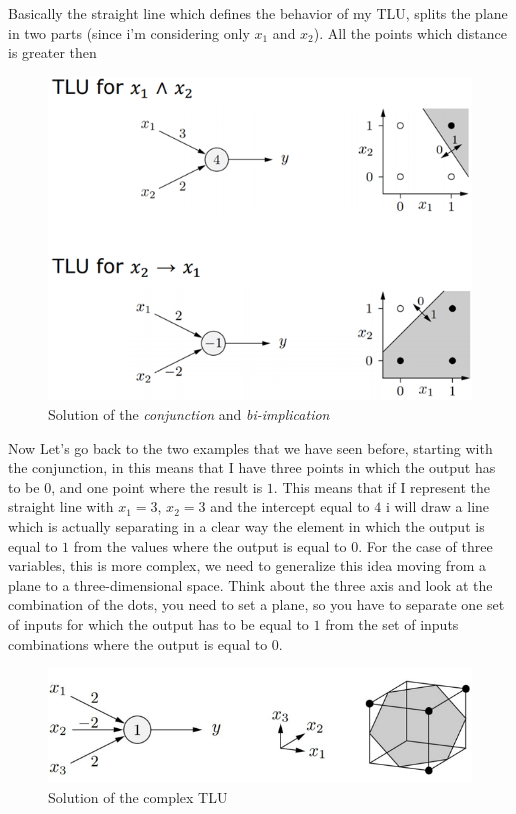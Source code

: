 \documentclass{article}
\begin{document}
Basically the straight line which defines the behavior of my TLU, splits the plane in two parts (since i'm
considering only $x_1$ and $x_2$). All the points which distance is greater then

\begin{figure}[H]
    \centering
    \includegraphics[scale=0.8]{images/tlu_examples_interp.png}
    \caption{Solution of the \textit{conjunction} and \textit{bi-implication}}
    \label{fig:example_interp}
\end{figure}

Now Let’s go back to the two examples that we have seen before,
starting with the conjunction, in this means that I have three points in which the output
has to be $0$, and one point where the result is $1$. This means that if I represent the straight
line with $x_1=3$, $x_2=3$ and the intercept equal to $4$ i will draw a line which is actually
separating in a clear way the element in which the output is equal to $1$ from the values
where the output is equal to $0$.
\newline
\newline
For the case of three variables, this is more complex, we need to generalize this idea moving from
a plane to a three-dimensional space. Think about the three axis and look at the combination of the
dots, you need to set a plane, so you have to separate one set of inputs for which the output has
to be equal to $1$ from the set of inputs combinations where the output is equal to $0$.

\begin{figure}[H]
    \centering
    \includegraphics[scale=0.6]{images/three_input_sol_example.png}
    \caption{Solution of the complex TLU}
    \label{fig:example_three_sol}
\end{figure}
\end{document}

